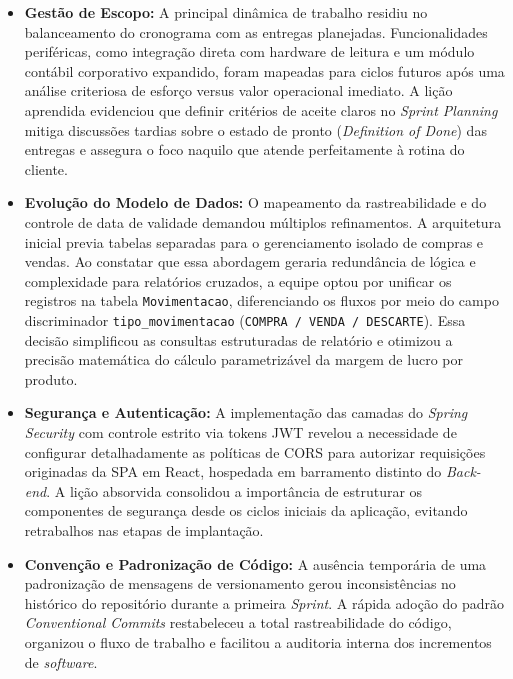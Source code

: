 \documentclass[
	12pt,				%
	openany,			%
	oneside,			%
	a4paper,			%
	english,			%
	french,				%
	spanish,			%
	brazil				%
	]{abntex2}
\begin{document}
\begin{itemize}
    \item \textbf{Gestão de Escopo:} A principal dinâmica de trabalho residiu no balanceamento do cronograma com as entregas planejadas. Funcionalidades periféricas, como integração direta com hardware de leitura e um módulo contábil corporativo expandido, foram mapeadas para ciclos futuros após uma análise criteriosa de esforço versus valor operacional imediato. A lição aprendida evidenciou que definir critérios de aceite claros no \textit{Sprint Planning} mitiga discussões tardias sobre o estado de pronto (\textit{Definition of Done}) das entregas e assegura o foco naquilo que atende perfeitamente à rotina do cliente.

    \item \textbf{Evolução do Modelo de Dados:} O mapeamento da rastreabilidade e do controle de data de validade demandou múltiplos refinamentos. A arquitetura inicial previa tabelas separadas para o gerenciamento isolado de compras e vendas. Ao constatar que essa abordagem geraria redundância de lógica e complexidade para relatórios cruzados, a equipe optou por unificar os registros na tabela \texttt{Movimentacao}, diferenciando os fluxos por meio do campo discriminador \texttt{tipo\_movimentacao} (\texttt{COMPRA / VENDA / DESCARTE}). Essa decisão simplificou as consultas estruturadas de relatório e otimizou a precisão matemática do cálculo parametrizável da margem de lucro por produto.

    \item \textbf{Segurança e Autenticação:} A implementação das camadas do \textit{Spring Security} com controle estrito via tokens JWT revelou a necessidade de configurar detalhadamente as políticas de CORS para autorizar requisições originadas da SPA em React, hospedada em barramento distinto do \textit{Back-end}. A lição absorvida consolidou a importância de estruturar os componentes de segurança desde os ciclos iniciais da aplicação, evitando retrabalhos nas etapas de implantação.

    \item \textbf{Convenção e Padronização de Código:} A ausência temporária de uma padronização de mensagens de versionamento gerou inconsistências no histórico do repositório durante a primeira \textit{Sprint}. A rápida adoção do padrão \textit{Conventional Commits} restabeleceu a total rastreabilidade do código, organizou o fluxo de trabalho e facilitou a auditoria interna dos incrementos de \textit{software}.
\end{itemize}
\end{document}
